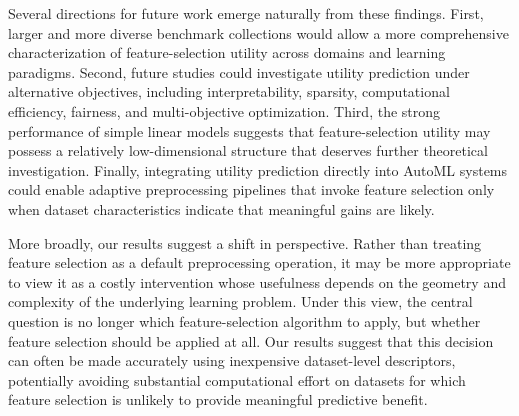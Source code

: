 \documentclass[preprint,12pt,authoryear]{elsarticle}
\begin{document}
Several directions for future work emerge naturally from these findings. First, larger and more diverse benchmark collections would allow a more comprehensive characterization of feature-selection utility across domains and learning paradigms. Second, future studies could investigate utility prediction under alternative objectives, including interpretability, sparsity, computational efficiency, fairness, and multi-objective optimization. Third, the strong performance of simple linear models suggests that feature-selection utility may possess a relatively low-dimensional structure that deserves further theoretical investigation. Finally, integrating utility prediction directly into AutoML systems could enable adaptive preprocessing pipelines that invoke feature selection only when dataset characteristics indicate that meaningful gains are likely.

More broadly, our results suggest a shift in perspective. Rather than treating feature selection as a default preprocessing operation, it may be more appropriate to view it as a costly intervention whose usefulness depends on the geometry and complexity of the underlying learning problem. Under this view, the central question is no longer which feature-selection algorithm to apply, but whether feature selection should be applied at all. Our results suggest that this decision can often be made accurately using inexpensive dataset-level descriptors, potentially avoiding substantial computational effort on datasets for which feature selection is unlikely to provide meaningful predictive benefit.
\end{document}
